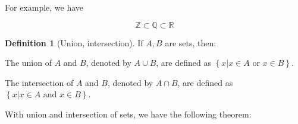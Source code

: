 \documentclass{article}
\theoremstyle{MyNonumberplain}
\theoremstyle{break}
\newcommand{\R}{\mathbb{R}}
\newcommand{\Q}{\mathbb{Q}}
\newcommand{\Z}{\mathbb{Z}}
\theoremstyle{break}
\theoremstyle{break}
\theoremstyle{definition}
\theoremstyle{break}
\newtheorem{definition}{Definition}[section]
\begin{document}
For example, we have 

        $$\Z\subset\Q\subset\R$$

\begin{defbox}
    \begin{definition}[Union, intersection]
        If $A,B$ are sets, then:\bigskip

        The union of $A$ and $B$, denoted by $A \cup B$, are defined as $\left\{ x|x \in A \text{ or } x \in B \right\}$. \bigskip
        
        The intersection of $A$ and $B$, denoted by $A \cap B$, are defined as $\left\{ x|x \in A \text{ and } x \in B \right\}$.            
    \end{definition}    
\end{defbox}

With union and intersection of sets, we have the following theorem:
\end{document}
